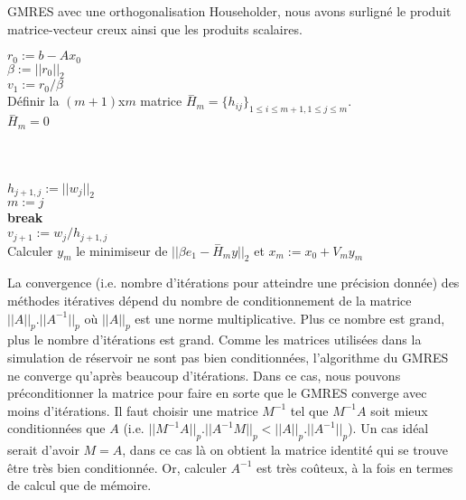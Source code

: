 \begin{algorithm}
  \caption{GMRES avec une orthogonalisation Householder, nous avons surligné le produit matrice-vecteur creux ainsi que les produits scalaires.}
  \label{algo:gmres}
  $r_0 := b - Ax_0$ \\
  $\beta := ||r_0||_2$ \\
  $v_1 := r_0/\beta$ \\
  Définir la $(m + 1)$x$m$ matrice $\overset{-}{H}_m = \{h_{ij}\}_{1 \leq i \leq m+1, 1 \leq j \leq m}$.  \\
  $\overset{-}{H}_m = 0$ \\
   {
    \\
     {
       \\
       \\
    }
    $h_{j+1,j} := ||w_j||_2$ \\
     {
      $m := j$ \\
      \textbf{break} \\
    }
    $v_{j+1} := w_j/h_{j+1,j}$ \\
  }
  Calculer $y_m$ le minimiseur de $||\beta{}e_1 - \overset{-}{H}_my||_2$ et $x_m := x_0 + V_my_m$
\end{algorithm}

La convergence (i.e. nombre d'itérations pour atteindre une précision donnée) des méthodes itératives dépend du nombre de conditionnement de la matrice $||A||_p.||A^{-1}||_p$ où $||A||_p$ est une norme multiplicative.
%
Plus ce nombre est grand, plus le nombre d'itérations est grand.
%
Comme les matrices utilisées dans la simulation de réservoir ne sont pas bien conditionnées, l'algorithme du GMRES ne converge qu'après beaucoup d'itérations.
%
Dans ce cas, nous pouvons préconditionner la matrice pour faire en sorte que le GMRES converge avec moins d'itérations.
%
Il faut choisir une matrice $M^{-1}$ tel que $M^{-1}A$ soit mieux conditionnées que $A$ (i.e. $||M^{-1}A||_p.||A^{-1}M||_p < ||A||_p.||A^{-1}||_p$).
%
Un cas idéal serait d'avoir $M=A$, dans ce cas là on obtient la matrice identité qui se trouve être très bien conditionnée.
%
Or, calculer $A^{-1}$ est très coûteux, à la fois en termes de calcul que de mémoire.



